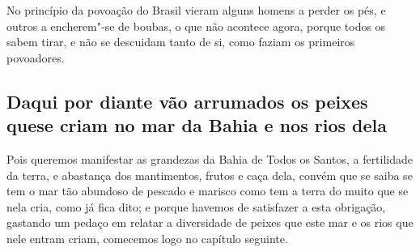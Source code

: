 No princípio da povoação do Brasil vieram alguns homens a perder os pés, e outros a
encherem"-se de boubas, o que não acontece agora, porque todos os sabem tirar, e não se
descuidam tanto de si, como faziam os primeiros povoadores.

\subsection{Daqui por diante vão arrumados os peixes que\break se criam no mar da Bahia e nos
rios dela}

Pois queremos manifestar as grandezas da Bahia de Todos os Santos, a fertilidade da terra,
e abastança dos mantimentos, frutos e caça dela, convém que se saiba se tem o mar tão
abundoso de pescado e marisco como tem a terra do muito que se nela cria, como já fica
dito; e porque havemos de satisfazer a esta obrigação, gastando um pedaço em relatar a
diversidade de peixes que este mar e os rios que nele entram criam, comecemos logo no
capítulo seguinte.

